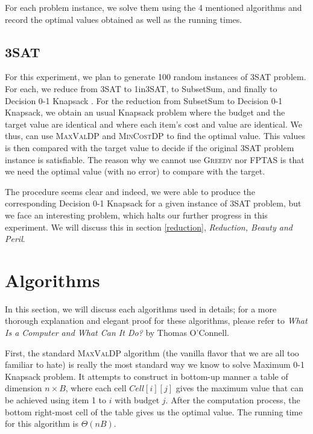 \documentclass[12pt, oneside]{book}
\begin{document}
For each problem instance, we solve them using the 4 mentioned
algorithms and record the optimal values obtained as well as the running
times.

\section{3SAT}\label{sat}

For this experiment, we plan to generate 100 random instances of 3SAT
problem. For each, we reduce from 3SAT to 1in3SAT, to SubsetSum, and
finally to Decision 0-1 Knapsack \citep{oconnell2013}. For the reduction
from SubsetSum to Decision 0-1 Knapsack, we obtain an usual Knapsack
problem where the budget and the target value are identical and where
each item's cost and value are identical. We thus, can use
\textsc{MaxValDP} and \textsc{MinCostDP} to find the optimal value. This
values is then compared with the target value to decide if the original
3SAT problem instance is satisfiable. The reason why we cannot use
\textsc{Greedy} nor \textsc{FPTAS} is that we need the optimal value
(with no error) to compare with the target.

The procedure seems clear and indeed, we were able to produce the
corresponding Decision 0-1 Knapsack for a given instance of 3SAT
problem, but we face an interesting problem, which halts our further
progress in this experiment. We will discuss this in section
\ref{reduction}, \emph{Reduction, Beauty and Peril}.

\chapter{Algorithms}\label{algorithms}

In this section, we will discuss each algorithms used in details; for a
more thorough explanation and elegant proof for these algorithms, please
refer to \emph{What Is a Computer and What Can It Do?} by Thomas
O'Connell.

First, the standard \textsc{MaxValDP} algorithm (the vanilla flavor that
we are all too familiar to hate) is really the most standard way we know
to solve Maximum 0-1 Knapsack problem. It attempts to construct in
bottom-up manner a table of dimension \(n \times B\), where each cell
\(Cell[i][j]\) gives the maximum value that can be achieved using item 1
to \(i\) with budget \(j\). After the computation process, the bottom
right-most cell of the table gives us the optimal value. The running
time for this algorithm is \(\Theta(nB)\).
\end{document}
